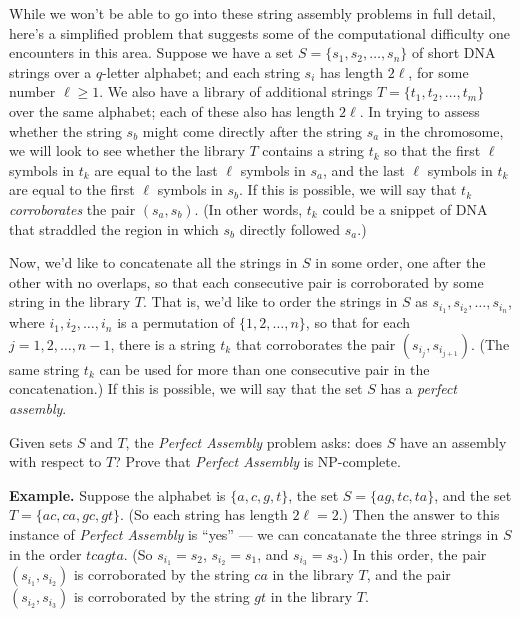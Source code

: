 \documentclass[12pt]{article}
\begin{document}
\begin{enumerate}
While we won't be able to go into these string assembly
problems in full detail, here's a simplified
problem that suggests some of the computational difficulty
one encounters in this area.
Suppose we have a set $S = \{s_1, s_2, \ldots, s_n\}$
of short DNA strings over a $q$-letter alphabet;
and each string $s_i$ has length $2\ell$, for some number $\ell \geq 1$.
We also have a library of additional strings
$T = \{t_1, t_2, \ldots, t_m\}$
over the same alphabet;
each of these also has length $2 \ell$.
In trying to assess whether the string $s_b$
might come directly after the string $s_a$
in the chromosome, we will look to see whether
the library $T$ contains a string $t_k$ so that
the first $\ell$ symbols in $t_k$ are equal
to the last $\ell$ symbols in $s_a$,
and the last $\ell$ symbols in $t_k$ are equal
to the first $\ell$ symbols in $s_b$.
If this is possible, we will say that
$t_k$ {\em corroborates} the pair $(s_a, s_b)$.
(In other words, $t_k$ could be a snippet of DNA
that straddled the region in which $s_b$ directly followed $s_a$.)

Now, we'd like to concatenate all the strings in $S$
in some order, one after the other with no overlaps,
so that each consecutive pair is corroborated
by some string in the library $T$.
That is, we'd like to order the strings in $S$ as
$s_{i_1}, s_{i_2}, \ldots, s_{i_n}$,
where $i_1, i_2, \ldots, i_n$ is a permutation of $\{1, 2, \ldots, n\}$,
so that for each $j = 1, 2, \ldots, n-1$,
there is a string $t_k$ that corroborates the
pair $(s_{i_j}, s_{i_{j+1}})$.
(The same string $t_k$ can be used for more than
one consecutive pair in the concatenation.)
If this is possible, we will say that the set $S$
has a {\em perfect assembly}.

Given sets $S$ and $T$, the {\em Perfect Assembly} problem asks:
does $S$ have an assembly with respect to $T$?
Prove that {\em Perfect Assembly} is NP-complete.

\smallskip
{\bf Example.} Suppose the alphabet is $\{a, c, g, t\}$,
the set $S = \{ag, tc, ta\}$, and the set
$T = \{ac, ca, gc, gt\}$.
(So each string has length $2 \ell = 2$.)
Then the answer to this instance of {\em Perfect Assembly}
is ``yes'' ---
we can concatanate the three strings in $S$ in the order
$tcagta$.
(So $s_{i_1} = s_2$, $s_{i_2} = s_1$, and $s_{i_3} = s_3$.)
In this order, the pair $(s_{i_1},s_{i_2})$ is
corroborated by the string $ca$ in the library $T$,
and the pair $(s_{i_2}, s_{i_3})$ is corroborated
by the string $gt$ in the library $T$.




\end{enumerate}
\end{document}
